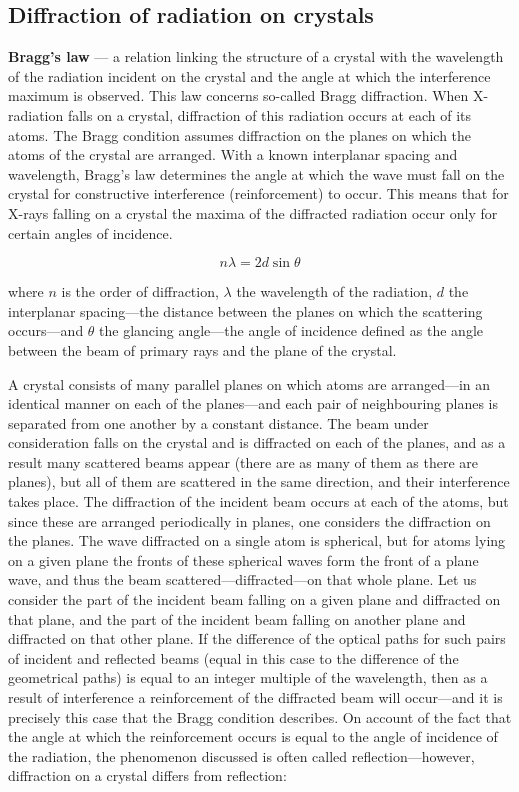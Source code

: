 \subsection{Diffraction of radiation on crystals}

\textbf{Bragg's law} --- a relation linking the structure of a crystal with the wavelength of the radiation incident on the crystal and the angle at which the interference maximum is observed. This law concerns so-called Bragg diffraction. When X-radiation falls on a crystal, diffraction of this radiation occurs at each of its atoms. The Bragg condition assumes diffraction on the planes on which the atoms of the crystal are arranged. With a known interplanar spacing and wavelength, Bragg's law determines the angle at which the wave must fall on the crystal for constructive interference (reinforcement) to occur. This means that for X-rays falling on a crystal the maxima of the diffracted radiation occur only for certain angles of incidence.

\begin{equation}
    n\lambda = 2d\sin{\theta}
\end{equation}

where $n$ is the order of diffraction, $\lambda$ the wavelength of the radiation, $d$ the interplanar spacing---the distance between the planes on which the scattering occurs---and $\theta$ the glancing angle---the angle of incidence defined as the angle between the beam of primary rays and the plane of the crystal.

A crystal consists of many parallel planes on which atoms are arranged---in an identical manner on each of the planes---and each pair of neighbouring planes is separated from one another by a constant distance. The beam under consideration falls on the crystal and is diffracted on each of the planes, and as a result many scattered beams appear (there are as many of them as there are planes), but all of them are scattered in the same direction, and their interference takes place. The diffraction of the incident beam occurs at each of the atoms, but since these are arranged periodically in planes, one considers the diffraction on the planes. The wave diffracted on a single atom is spherical, but for atoms lying on a given plane the fronts of these spherical waves form the front of a plane wave, and thus the beam scattered---diffracted---on that whole plane. Let us consider the part of the incident beam falling on a given plane and diffracted on that plane, and the part of the incident beam falling on another plane and diffracted on that other plane. If the difference of the optical paths for such pairs of incident and reflected beams (equal in this case to the difference of the geometrical paths) is equal to an integer multiple of the wavelength, then as a result of interference a reinforcement of the diffracted beam will occur---and it is precisely this case that the Bragg condition describes. On account of the fact that the angle at which the reinforcement occurs is equal to the angle of incidence of the radiation, the phenomenon discussed is often called reflection---however, diffraction on a crystal differs from reflection:

